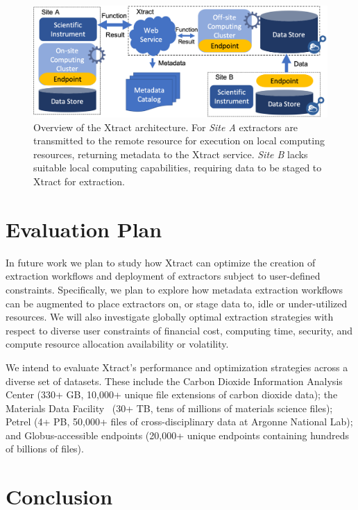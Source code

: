 \documentclass[sigconf, 9pt]{acmart}
\newcommand{\name}{Xtract}
\begin{document}
\begin{figure}[t]
	\centering
	\includegraphics[scale=0.35]{figs/updated-fig.png}
	\caption{Overview of the \name{} architecture. For \textit{Site A} extractors are transmitted to the remote resource for execution on local computing resources, returning metadata to the \name{} service. 
    \textit{Site B} lacks suitable local computing capabilities, requiring data to be staged to \name{} for extraction.}
	\label{fig:arch}
\end{figure}


\section{Evaluation Plan}
\label{sec:eval}

In future work we plan to study how \name{} can optimize the creation of extraction workflows
and deployment of extractors subject to user-defined constraints. 
Specifically, we plan to explore how metadata extraction workflows can be augmented to 
place extractors on, or stage data to, idle or under-utilized resources. 
We will also investigate globally optimal extraction strategies with respect to diverse user constraints of financial cost, computing time, security, and compute resource allocation 
availability or volatility.

We intend to evaluate \name{}'s performance and optimization strategies 
across a diverse set of datasets. 
These include the Carbon Dioxide Information Analysis Center (330+ GB, 10,000+ unique file extensions of carbon dioxide data); 
the Materials Data Facility~\cite{blaiszik2019mdf} (30+ TB, tens of millions of materials science files); 
Petrel (4+ PB, 50,000+ files of cross-disciplinary data at Argonne National Lab); 
and Globus-accessible endpoints (20,000+ unique endpoints containing hundreds of billions of files).


\section{Conclusion}
\label{sec:conc}
\end{document}
